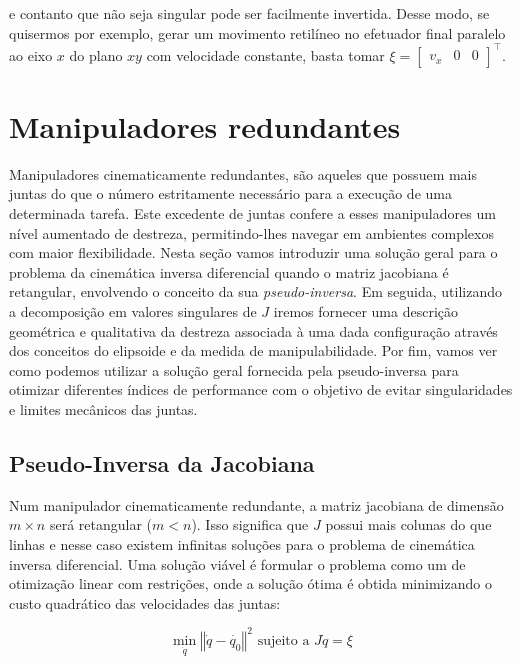 e contanto que não seja singular pode ser facilmente invertida. Desse modo, se
quisermos por exemplo, gerar um movimento retilíneo no efetuador final paralelo
ao eixo \(x\) do plano \(xy\) com velocidade constante, basta tomar \(\xi = \begin{bmatrix}
    v_x & 0 & 0
\end{bmatrix}^\top\).

\section{Manipuladores redundantes}

Manipuladores cinematicamente redundantes, são aqueles que possuem mais juntas
do que o número estritamente necessário para a execução de uma determinada
tarefa. Este excedente de juntas confere a esses manipuladores um nível
aumentado de destreza, permitindo-lhes navegar em ambientes complexos com maior
flexibilidade. Nesta seção vamos introduzir uma solução geral para o problema
da cinemática inversa diferencial quando o matriz jacobiana é retangular,
envolvendo o conceito da sua \emph{pseudo-inversa}. Em seguida, utilizando a
decomposição em valores singulares de \(J\) iremos fornecer uma descrição
geométrica e qualitativa da destreza associada à uma dada configuração através
dos conceitos do elipsoide e da medida de manipulabilidade. Por fim, vamos ver
como podemos utilizar a solução geral fornecida pela pseudo-inversa para
otimizar diferentes índices de performance com o objetivo de evitar
singularidades e limites mecânicos das juntas.

\subsection{Pseudo-Inversa da Jacobiana}

Num manipulador cinematicamente redundante, a matriz jacobiana de dimensão \(m
\times n\) será retangular (\(m < n\)). Isso significa que \(J\) possui mais
colunas do que linhas e nesse caso existem infinitas soluções para o problema
de cinemática inversa diferencial. Uma solução viável é formular o problema como 
um de otimização linear com restrições, onde a solução ótima é obtida minimizando 
o custo quadrático das velocidades das juntas:

\begin{equation}
    \min_{\dot{q}} \left\Vert \dot{q} - \dot{q_0} \right\Vert^2 \text{ sujeito a } J \dot{q} = \xi
\end{equation}

